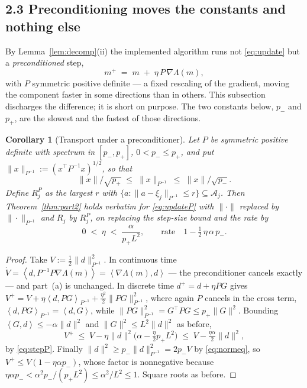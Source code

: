 \documentclass[11pt]{article}
\newtheorem{corollary}[theorem]{Corollary}
\theoremstyle{definition}
\newcommand{\cA}{\mathcal{A}}
\newcommand{\ip}[2]{\left\langle #1, #2 \right\rangle}
\begin{document}
\subsection*{2.3 Preconditioning moves the constants and nothing else}
\label{sec:precond}

By Lemma~\ref{lem:decomp}(ii) the implemented algorithm runs not \eqref{eq:update}
but a \emph{preconditioned} step,
\begin{equation}\label{eq:updateP}
  m^+ \;=\; m \;+\; \eta\,P\,\nabla\Lambda(m),
\end{equation}
with $P$ symmetric positive definite --- a fixed rescaling of the gradient, moving
the component faster in some directions than in others. This subsection discharges
the difference; it is short on purpose. The two constants below, $p_-$ and $p_+$,
are the slowest and the fastest of those directions.

\begin{corollary}[Transport under a preconditioner]\label{cor:precond}
Let $P$ be symmetric positive definite with spectrum in $[p_-, p_+]$,
$0 < p_- \le p_+$, and put $\|x\|_{P^{-1}} := (x^\top P^{-1}x)^{1/2}$, so that
\begin{equation}\label{eq:normeq}
  \|x\|/\sqrt{p_+} \;\le\; \|x\|_{P^{-1}} \;\le\; \|x\|/\sqrt{p_-} .
\end{equation}
Define $R_j^P$ as the largest $r$ with
$\{a : \|a - \xi_j\|_{P^{-1}} \le r\} \subseteq \cA_j$. Then
Theorem~\ref{thm:part2} holds verbatim for \eqref{eq:updateP} with
$\|\cdot\|$ replaced by $\|\cdot\|_{P^{-1}}$ and $R_j$ by $R_j^P$, on replacing
the step-size bound and the rate by
\begin{equation}\label{eq:stepP}
  0 \;<\; \eta \;<\; \frac{\alpha}{p_+ L^2},
  \qquad\text{rate}\quad 1 - \tfrac12\,\eta\,\alpha\,p_- .
\end{equation}
\end{corollary}

\begin{proof}
Take $V := \tfrac12\|d\|^2_{P^{-1}}$. In continuous time
$\dot V = \ip{d}{P^{-1}P\nabla\Lambda(m)} = \ip{\nabla\Lambda(m)}{d}$ --- the
preconditioner cancels exactly --- and part~(a) is unchanged. In discrete time
$d^+ = d + \eta PG$ gives
$V^+ = V + \eta\ip{d}{PG}_{P^{-1}} + \tfrac{\eta^2}{2}\|PG\|^2_{P^{-1}}$, where
again $P$ cancels in the cross term, $\ip{d}{PG}_{P^{-1}} = \ip{d}{G}$, while
$\|PG\|^2_{P^{-1}} = G^\top PG \le p_+\|G\|^2$. Bounding
$\ip{G}{d} \le -\alpha\|d\|^2$ and $\|G\|^2 \le L^2\|d\|^2$ as before,
\[
  V^+ \;\le\; V - \eta\|d\|^2\Big(\alpha - \tfrac{\eta}{2}p_+L^2\Big)
  \;\le\; V - \tfrac{\eta\alpha}{2}\|d\|^2 ,
\]
by \eqref{eq:stepP}. Finally $\|d\|^2 \ge p_-\|d\|^2_{P^{-1}} = 2p_-V$ by
\eqref{eq:normeq}, so $V^+ \le V(1 - \eta\alpha p_-)$, whose factor is
nonnegative because $\eta\alpha p_- < \alpha^2 p_-/(p_+L^2) \le \alpha^2/L^2
\le 1$. Square roots as before.
\end{proof}
\end{document}
